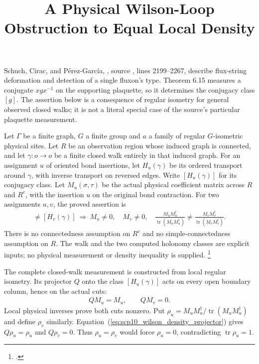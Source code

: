 \documentclass{article}
\title{A Physical Wilson-Loop Obstruction to Equal Local Density}
\author{}
\date{}
\begin{document}
\maketitle
{}

Schuch, Cirac, and P\'erez-Garc\'ia,
\cite[Lemma~6.14 and Theorem~6.15]{Schuch2010PEPS},
source , lines 2199--2267,
describe flux-string deformation and detection of a single fluxon's type.
Theorem 6.15 measures a conjugate $xgx^{-1}$ on the supporting plaquette,
so it determines the conjugacy class $[g]$. The assertion below is a
consequence of regular isometry for general observed closed walks; it is
not a literal special case of the source's particular plaquette measurement.

Let $\Gamma$ be a finite graph, $G$ a finite group and $a$ a family of regular
$G$-isometric physical sites. Let $R$ be an observation region whose induced
graph is connected, and let $\gamma:o\to o$ be a finite closed walk entirely
in that induced graph. For an assignment $u$ of oriented bond insertions,
let $H_u(\gamma)$ be its ordered transport around $\gamma$, with inverse
transport on reversed edges. Write $[H_u(\gamma)]$ for its conjugacy class.
Let $M_u(\sigma,\tau)$ be the actual physical coefficient matrix across
$R$ and $R^c$, with the insertion $u$ on the original bond contraction.
For two assignments $u,v$, the proved assertion is
\begin{align}
    [H_u(\gamma)]\ne[H_v(\gamma)]
    \ \Longrightarrow\
    M_u\ne0,\quad M_v\ne0,\quad
    \frac{M_uM_u^\dagger}{\operatorname{tr}(M_uM_u^\dagger)}
    \ne
    \frac{M_vM_v^\dagger}{\operatorname{tr}(M_vM_v^\dagger)}.
    \label{eq:scp10_wilson_density_separation}
\end{align}
There is no connectedness assumption on $R^c$ and no simple-connectedness
assumption on $R$. The walk and the two computed holonomy classes are explicit
inputs; no physical measurement or density inequality is supplied.
\footnote{.}

The complete closed-walk measurement is constructed from local regular
isometry. Its projector $Q$ onto the class $[H_u(\gamma)]$ acts on every
open boundary column, hence on the actual cuts:
\begin{align}
    QM_u=M_u,\qquad QM_v=0.
    \label{eq:scp10_wilson_density_projector}
\end{align}
Local physical inverses prove both cuts nonzero. Put
$\rho_u=M_uM_u^\dagger/\operatorname{tr}(M_uM_u^\dagger)$ and define
$\rho_v$ similarly. Equation~(\ref{eq:scp10_wilson_density_projector}) gives
$Q\rho_u=\rho_u$ and $Q\rho_v=0$. Thus $\rho_u=\rho_v$ would force
$\rho_u=0$, contradicting $\operatorname{tr}\rho_u=1$.
\end{document}
